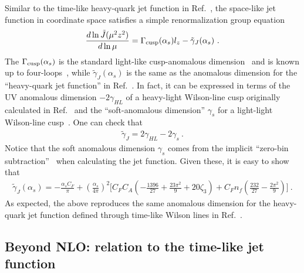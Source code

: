 \documentclass[a4paper,11pt]{article}
\begin{document}
Similar to the time-like heavy-quark jet function in Ref.~\cite{Jain:2008gb}, the space-like jet function in coordinate space satisfies a simple renormalization group equation
\begin{align}\label{eq:RGEtiledJ}
\frac{d \ln \tilde J(\mu^2 z^2)}{d\ln \mu}=\Gamma_{\rm cusp}(\alpha_s) l_z-\tilde \gamma_{J}(\alpha_s) \ .
\end{align}
The $\Gamma_{\rm cusp}(\alpha_s)$ is the standard light-like cusp-anomalous dimension~\cite{Korchemsky:1987wg} and is known up to four-loops~\cite{Henn:2019swt,vonManteuffel:2020vjv}, while $\tilde \gamma_{J}(\alpha_s)$ is the same as the anomalous dimension for the ``heavy-quark jet function'' in Ref.~\cite{Jain:2008gb}. In fact, it can be expressed in terms of the UV anomalous dimension $-2\gamma_{HL}$ of a heavy-light Wilson-line cusp originally calculated in Ref.~\cite{Korchemsky:1992xv} and the ``soft-anomalous dimension'' $\gamma_s$ for a light-light Wilson-line cusp~\cite{Korchemskaya:1992je}. 
One can check that 
\begin{align}
\tilde \gamma_{J}=2\gamma_{HL}-2\gamma_s \ .
\end{align}
Notice that the soft anomalous dimension $\gamma_s$ comes from the implicit ``zero-bin subtraction''~\cite{Becher:2006mr, Manohar:2006nz, Jain:2008gb} when calculating the jet function. Given these, it is easy to show that 
\begin{align}\label{eq:resulttildegammaJ}
\tilde \gamma_{J}(\alpha_s)=-\frac{\alpha_s C_F}{\pi}+\left(\frac{\alpha_s}{4\pi}\right)^2\bigg[C_FC_A\left(-\frac{1396}{27}+\frac{23\pi^2}{9}+20\zeta_3\right)+C_Fn_f\left(\frac{232}{27}-\frac{2\pi^2}{9}\right)\bigg] \ .
\end{align}
As expected, the above reproduces the same anomalous dimension for the heavy-quark jet function defined through time-like Wilson lines in Ref.~\cite{Jain:2008gb}. 

\subsection{Beyond NLO: relation to the time-like jet function}
\end{document}
